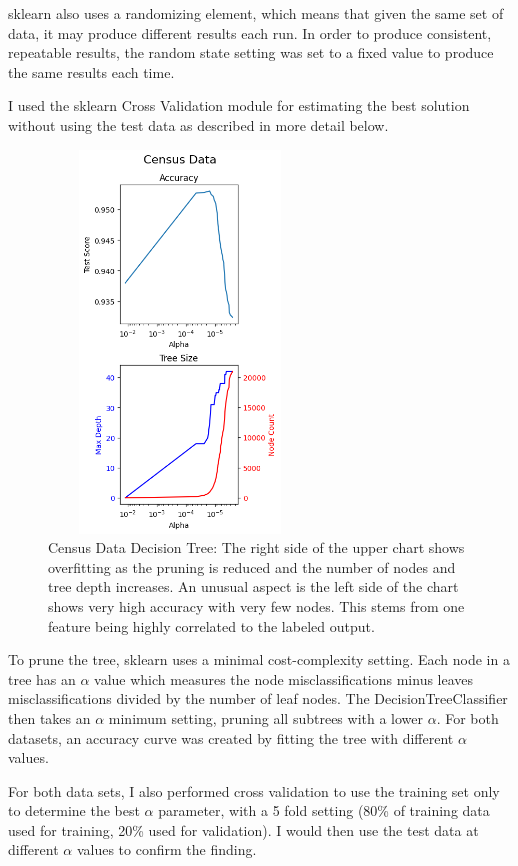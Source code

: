 \documentclass[letterpaper]{article} %
\begin{document}
sklearn also uses a randomizing element, which means that given the same set of data, it may produce different results each run.  In order to produce consistent, repeatable results, the random state setting was set to a fixed value to produce the same results each time.

I used the sklearn Cross Validation module for estimating the best solution without using the test data as described in more detail below.



\begin{figure}[htb]
\centering
\includegraphics[width=2.75in, height=4in]{figures/Census_Data_decision_tree.png}
\caption{Census Data Decision Tree:  The right side of the upper chart shows overfitting as the pruning is reduced and the number of nodes and tree depth increases.  An unusual aspect is the left side of the chart shows very high accuracy with very few nodes.  This stems from one feature being highly correlated to the labeled output.}
\label{fig:census_data_decision_tree}
\end{figure}

To prune the tree, sklearn uses a minimal cost-complexity setting.  Each node in a tree has an $\alpha$ value which measures the node misclassifications minus leaves misclassifications divided by the number of leaf nodes.  The DecisionTreeClassifier then takes an $\alpha$ minimum setting, pruning all subtrees with a lower $\alpha$.   For both datasets, an accuracy curve was created by fitting the tree with different $\alpha$ values.  

For both data sets, I also performed cross validation to use the training set only to determine the best $\alpha$ parameter, with a 5 fold setting (80\% of training data used for training, 20\% used for validation).  I would then use the test data at different $\alpha$ values to confirm the finding.
\end{document}
